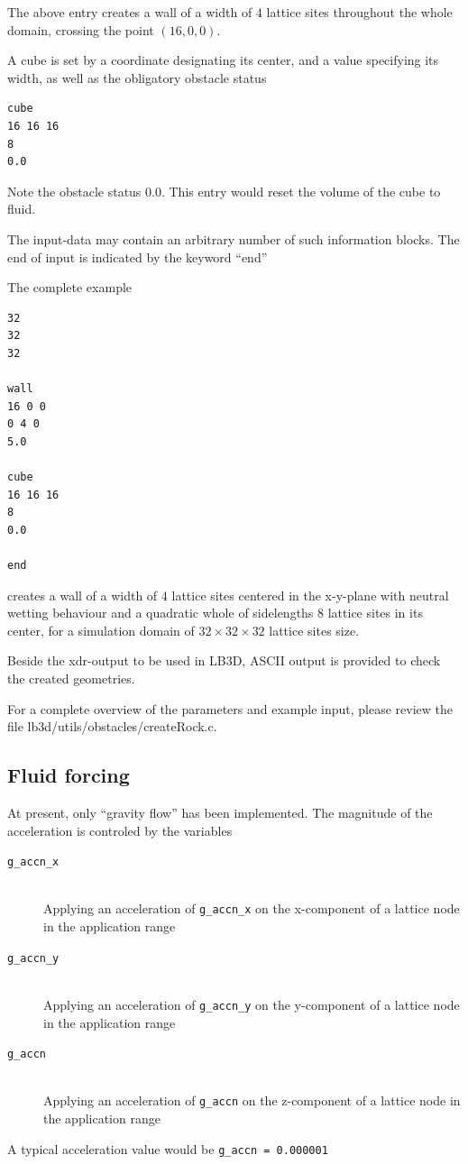 \documentclass[a4paper]{article}
\begin{document}
The above entry creates a wall of a width of $4$ lattice sites throughout the whole domain, crossing the point $(16,0,0)$.

A cube is set by a coordinate designating its center, and a value specifying its width, as well as the obligatory obstacle status
\begin{verbatim}
cube
16 16 16
8
0.0
\end{verbatim}
Note the obstacle status $0.0$. This entry would reset the volume of the cube to fluid.

The input-data may contain an arbitrary number of such information blocks. The end of input is indicated by the keyword ``end''

The complete example
\begin{verbatim}
32
32
32

wall
16 0 0
0 4 0
5.0

cube
16 16 16
8
0.0

end
\end{verbatim}
creates a wall of a width of $4$ lattice sites centered in the x-y-plane with neutral wetting behaviour and a quadratic whole of sidelengths $8$ lattice sites in its center, for a simulation domain of $32\times32\times32$ lattice sites size. 

Beside the xdr-output to be used in LB3D, ASCII output is provided to check the created geometries.

For a complete overview of the parameters and example input, please review the file lb3d/utils/obstacles/createRock.c.

\subsection{Fluid forcing}

	At present, only ``gravity flow'' has been implemented.
        The magnitude of the acceleration is controled by the variables
        \begin{description}
          \item [{\tt g\_accn\_x}]~\\
            Applying an acceleration of {\tt g\_accn\_x} on the x-component of a lattice node in the application range 
          \item [{\tt g\_accn\_y}]~\\
            Applying an acceleration of {\tt g\_accn\_y} on the y-component of a lattice node in the application range 
          \item [{\tt g\_accn}]~\\
            Applying an acceleration of {\tt g\_accn} on the z-component of a lattice node in the application range 
          \end{description}
          A typical acceleration value would be {\tt g\_accn = 0.000001}\\~\\
\end{document}
